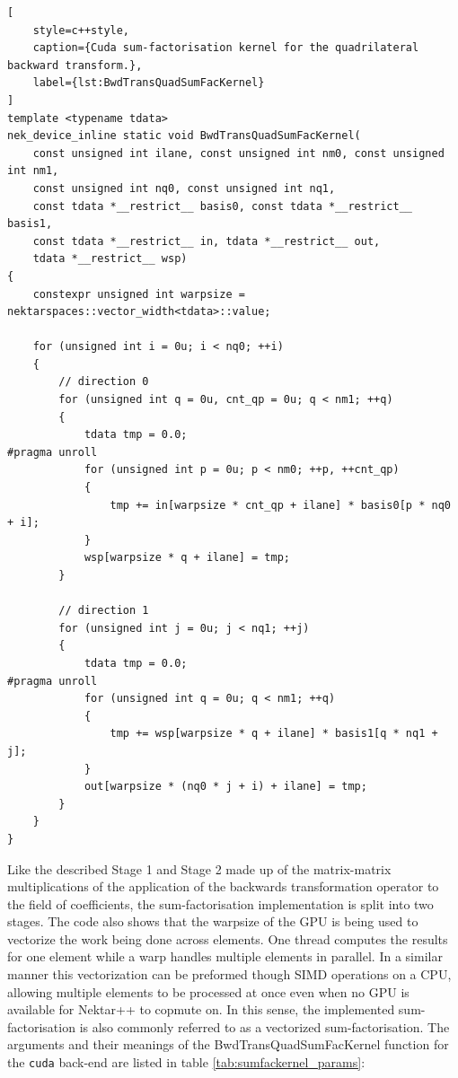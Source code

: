 \begin{minipage}{\textwidth}
\begin{lstlisting}[
    style=c++style,
    caption={Cuda sum-factorisation kernel for the quadrilateral backward transform.},
    label={lst:BwdTransQuadSumFacKernel}
]
template <typename tdata>
nek_device_inline static void BwdTransQuadSumFacKernel(
    const unsigned int ilane, const unsigned int nm0, const unsigned int nm1,
    const unsigned int nq0, const unsigned int nq1,
    const tdata *__restrict__ basis0, const tdata *__restrict__ basis1,
    const tdata *__restrict__ in, tdata *__restrict__ out,
    tdata *__restrict__ wsp)
{
    constexpr unsigned int warpsize = nektarspaces::vector_width<tdata>::value;

    for (unsigned int i = 0u; i < nq0; ++i)
    {
        // direction 0
        for (unsigned int q = 0u, cnt_qp = 0u; q < nm1; ++q)
        {
            tdata tmp = 0.0;
#pragma unroll
            for (unsigned int p = 0u; p < nm0; ++p, ++cnt_qp)
            {
                tmp += in[warpsize * cnt_qp + ilane] * basis0[p * nq0 + i];
            }
            wsp[warpsize * q + ilane] = tmp;
        }

        // direction 1
        for (unsigned int j = 0u; j < nq1; ++j)
        {
            tdata tmp = 0.0;
#pragma unroll
            for (unsigned int q = 0u; q < nm1; ++q)
            {
                tmp += wsp[warpsize * q + ilane] * basis1[q * nq1 + j];
            }
            out[warpsize * (nq0 * j + i) + ilane] = tmp;
        }
    }
}
\end{lstlisting}
\end{minipage}
Like the described Stage 1 and Stage 2 made up of the matrix-matrix multiplications of the application of the backwards transformation operator to the field of coefficients, the sum-factorisation implementation is split into two stages. The code also shows that the warpsize of the GPU is being used to vectorize the work being done across elements. One thread computes the results for one element while a warp handles multiple elements in parallel. In a similar manner this vectorization can be preformed though SIMD operations on a CPU, allowing multiple elements to be processed at once even when no GPU is available for Nektar++ to copmute on. In this sense, the implemented sum-factorisation is also commonly referred to as a vectorized sum-factorisation.
The arguments and their meanings of the BwdTransQuadSumFacKernel function for the \texttt{cuda} back-end are listed in table \ref{tab:sumfackernel_params}:

